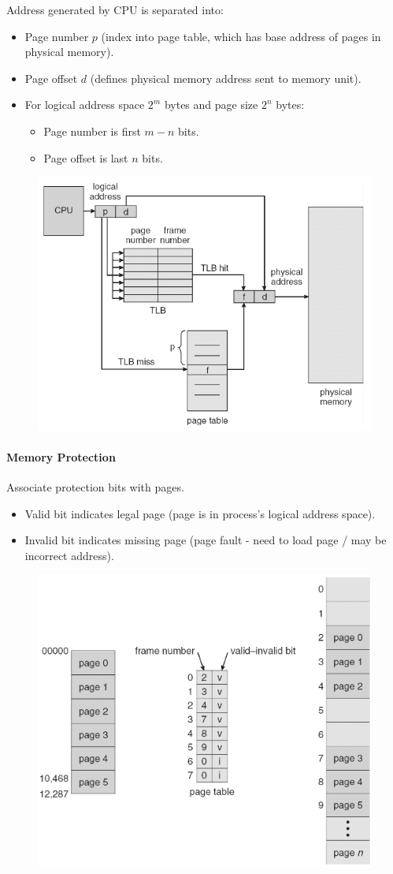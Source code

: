 \documentclass[twocolumn,english]{article}
\begin{document}
Address generated by CPU is separated into:
\begin{itemize}
\item Page number $p$ (index into page table, which has base address of
pages in physical memory).
\item Page offset $d$ (defines physical memory address sent to memory unit).
\item For logical address space $2^{m}$ bytes and page size $2^{n}$ bytes:
\begin{itemize}
\item Page number is first $m-n$ bits.
\item Page offset is last $n$ bits.
\end{itemize}
\end{itemize}
\begin{figure}[H]
\centering{}\includegraphics[width=0.75\linewidth]{img/address-translation}
\end{figure}

\paragraph{Memory Protection}

Associate protection bits with pages.
\begin{itemize}
\item Valid bit indicates legal page (page is in process's logical address
space).
\item Invalid bit indicates missing page (page fault - need to load page
/ may be incorrect address).
\end{itemize}
\begin{figure}[H]
\centering{}\includegraphics[width=0.6\linewidth]{img/page-table}
\end{figure}
\end{document}
